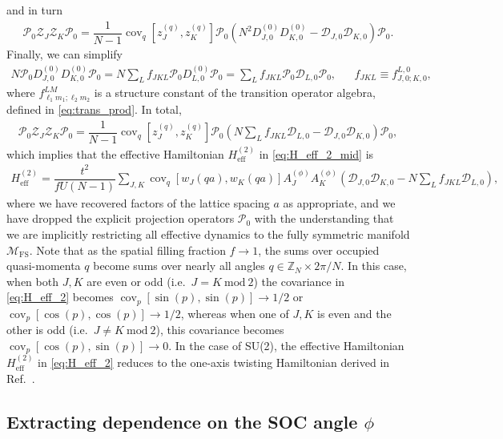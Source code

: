 \documentclass[nofootinbib,notitlepage,11pt]{revtex4-2}
\renewcommand{\t}{\text} %
\newcommand{\f}[2]{\dfrac{#1}{#2}} %
\newcommand{\p}[1]{\left(#1\right)} %
\renewcommand{\sp}[1]{\left[#1\right]} %
\newcommand{\1}{\mathds{1}}
\newcommand{\D}{\mathcal{D}}
\newcommand{\M}{\mathcal{M}}
\renewcommand{\P}{\mathcal{P}}
\newcommand{\Z}{\mathcal{Z}}
\newcommand{\ZZ}{\mathbb{Z}}
\newcommand{\FS}{\text{FS}}
\DeclareMathOperator{\cov}{cov}
\begin{document}
and in turn
\begin{align}
  \P_0 \Z_J \Z_K \P_0
  = \f1{N-1} \cov_q\sp{z_J^{(q)},z_K^{(q)}}
  \P_0 \p{N^2 D_{J,0}^{(0)} D_{K,0}^{(0)} - \D_{J,0} \D_{K,0}} \P_0.
\end{align}
Finally, we can simplify
\begin{align}
  N \P_0 D_{J,0}^{(0)} D_{K,0}^{(0)} \P_0
  = N \sum_L f_{JKL} \P_0 D_{L,0}^{(0)} \P_0
  = \sum_L f_{JKL} \P_0 \D_{L,0} \P_0,
  &&
  f_{JKL} \equiv f_{J,0;K,0}^{L,0},
\end{align}
where $f_{\ell_1 m_1;\ell_2 m_2}^{LM}$ is a structure constant of the
transition operator algebra, defined in \eqref{eq:trans_prod}.  In
total,
\begin{align}
  \P_0 \Z_J \Z_K \P_0
  = \f1{N-1} \cov_q\sp{z_J^{(q)},z_K^{(q)}}
  \P_0 \p{N \sum_L f_{JKL} \D_{L,0} - \D_{J,0} \D_{K,0}} \P_0,
\end{align}
which implies that the effective Hamiltonian $H_{\t{eff}}^{(2)}$ in
\eqref{eq:H_eff_2_mid} is
\begin{align}
  H_{\t{eff}}^{(2)}
  = \f{t^2}{fU\p{N-1}} \sum_{J,K}
  \cov_q\sp{w_J\p{qa},w_K\p{qa}} A_J^{(\phi)} A_K^{(\phi)}
  \p{\D_{J,0} \D_{K,0} - N \sum_L f_{JKL} \D_{L,0}},
  \label{eq:H_eff_2}
\end{align}
where we have recovered factors of the lattice spacing $a$ as
appropriate, and we have dropped the explicit projection operators
$\P_0$ with the understanding that we are implicitly restricting all
effective dynamics to the fully symmetric manifold $\M_\FS$.  Note
that as the spatial filling fraction $f\to1$, the sums over occupied
quasi-momenta $q$ become sums over nearly all angles
$q\in\ZZ_N\times2\pi/N$.  In this case, when both $J,K$ are even or
odd (i.e.~$J=K~\t{mod}~2$) the covariance in \eqref{eq:H_eff_2}
becomes $\cov_p\sp{\sin\p{p},\sin\p{p}}\to1/2$ or
$\cov_p\sp{\cos\p{p},\cos\p{p}}\to1/2$, whereas when one of $J,K$ is
even and the other is odd (i.e.~$J\ne K~\t{mod}~2$), this covariance
becomes $\cov_p\sp{\cos\p{p},\sin\p{p}}\to0$.  In the case of SU(2),
the effective Hamiltonian $H_{\t{eff}}^{(2)}$ in \eqref{eq:H_eff_2}
reduces to the one-axis twisting Hamiltonian derived in
Ref.~\cite{he2019engineering}.

\subsection{Extracting dependence on the SOC angle $\phi$}
\end{document}
